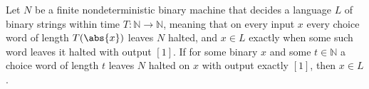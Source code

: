 \begin{lemma}
\label{Complexity.nh_mem_of_accepts}
\leanok
{}
Let $N$ be a finite nondeterministic binary machine that decides a language $L$ of binary
strings within time $T:\mathbb{N}\to\mathbb{N}$, meaning that on every input $x$ every choice word
of length $T(\abs{x})$ leaves $N$ halted, and $x\in L$ exactly when some such word leaves it
halted with output $[1]$. If for some binary $x$ and some $t\in\mathbb{N}$ a choice word of length
$t$ leaves $N$ halted on $x$ with output exactly $[1]$, then $x\in L$.
\end{lemma}
